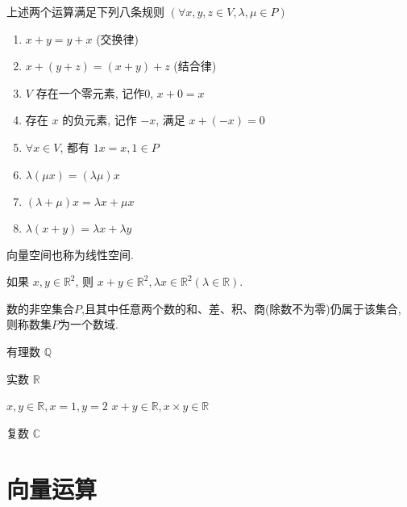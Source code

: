 \begin{theorem}
    上述两个运算满足下列八条规则 \( (\forall x, y, z \in V, \lambda, \mu \in P) \) 
\begin{enumerate}
    \item \( x+y=y+x \) (交换律) 
    \item \( x+(y+z)=(x+y)+z \) (结合律)
    \item \( V \) 存在一个零元素, 记作$0$, \( x+0=x \)
    \item 存在 \( x \) 的负元素, 记作 \( -x \), 满足 \( x+(-x)=0 \)
    \item \( \forall x \in V \), 都有 \( 1 x=x, 1 \in P \)
    \item \( \lambda(\mu x)=(\lambda \mu) x \)
    \item \( (\lambda+\mu) x=\lambda x+\mu x \)
    \item \(  \lambda(x+y)=\lambda x+\lambda y \)
\end{enumerate}
\end{theorem}

\begin{corollary}
    向量空间也称为线性空间.
\end{corollary}

\begin{corollary}
    如果 \( x, y \in \mathbb{R}^{2} \), 则 \( x+y \in \mathbb{R}^{2}, \lambda x \in \mathbb{R}^{2}(\lambda \in \mathbb{R}) \).
\end{corollary}

\begin{definition}[数域]
    数的非空集合$P$,且其中任意两个数的和、差、积、商(除数不为零)仍属于该集合, 则称数集$P$为一个数域. 
\end{definition}

\begin{example}
    有理数 $ \mathbb{Q} $
\end{example}

\begin{example}
    实数 $ \mathbb{R} $

    $ x, y \in \mathbb{R}, x=1, y=2 $
    $ x+y \in \mathbb{R}  ,x \times y \in \mathbb{R} $
\end{example}

\begin{example}
    复数 $ \mathbb{C} $
\end{example}

\section{向量运算}

